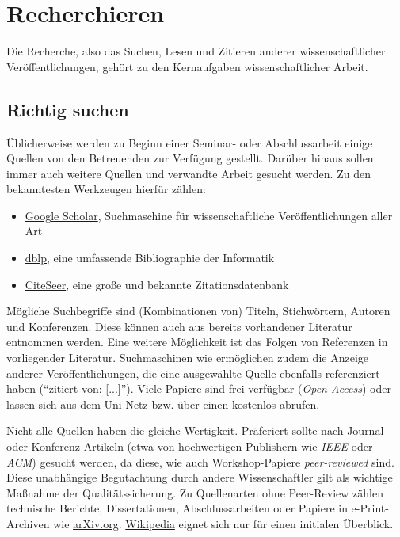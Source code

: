 \section{Recherchieren}
\label{sec:Recherchieren}

Die Recherche, also das Suchen, Lesen und Zitieren anderer wissenschaftlicher Veröffentlichungen, gehört zu den Kernaufgaben wissenschaftlicher Arbeit.

\subsection{Richtig suchen}
\label{sec:Recherchieren:Suchen}

Üblicherweise werden zu Beginn einer Seminar- oder Abschlussarbeit einige Quellen von den Betreuenden zur Verfügung gestellt. 
Darüber hinaus sollen immer auch weitere Quellen und verwandte Arbeit gesucht werden. 
Zu den bekanntesten Werkzeugen hierfür zählen:

\smallskip
\begin{itemize}[label={\symbolTool}]
    \item \href{https://scholar.google.com/}{Google Scholar}, Suchmaschine für wissenschaftliche Veröffentlichungen aller Art
    \item \href{https://dblp.org/}{dblp}, eine umfassende Bibliographie der Informatik
    \item \href{https://citeseerx.ist.psu.edu/}{CiteSeer}, eine große und bekannte Zitationsdatenbank 
\end{itemize}
\smallskip

\noindent
Mögliche Suchbegriffe sind (Kombinationen von) Titeln, Stichwörtern, Autoren und Konferenzen. 
Diese können auch aus bereits vorhandener Literatur entnommen werden. 
Eine weitere Möglichkeit ist das Folgen von Referenzen in vorliegender Literatur. 
Suchmaschinen wie  ermöglichen zudem die Anzeige anderer Veröffentlichungen, die eine ausgewählte Quelle ebenfalls referenziert haben (\enquote{zitiert von: [...]}). 
Viele Papiere sind frei verfügbar (\emph{Open Access}) oder lassen sich aus dem Uni-Netz bzw. über einen  kostenlos abrufen.

Nicht alle Quellen haben die gleiche Wertigkeit. 
Präferiert sollte nach Journal- oder Konferenz-Artikeln (etwa von hochwertigen Publishern wie \emph{IEEE} oder \emph{ACM}) gesucht werden, da diese, wie auch Workshop-Papiere \emph{peer-reviewed} sind. 
Diese unabhängige Begutachtung durch andere Wissenschaftler gilt als wichtige Maßnahme der Qualitätssicherung. 
Zu Quellenarten ohne Peer-Review zählen technische Berichte, Dissertationen, Abschlussarbeiten oder Papiere in e-Print-Archiven wie \href{https://arXiv.org}{arXiv.org}.  
\href{https://www.wikipedia.org/}{Wikipedia} eignet sich nur für einen initialen Überblick.

